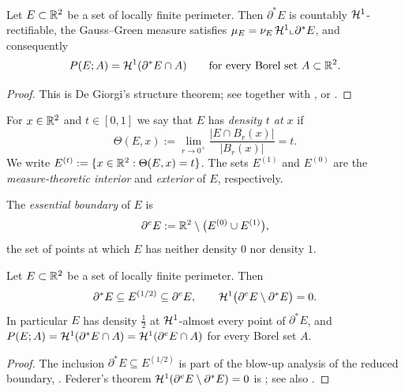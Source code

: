 \begin{theorem}\label{thm:de-giorgi}
Let $E\subset\mathbb{R}^2$ be a set of locally finite perimeter. Then $\partial^*E$ is
countably $\mathcal{H}^1$-rectifiable, the Gauss--Green measure satisfies
$\mu_E=\nu_E\,\mathcal{H}^1\llcorner\partial^*E$, and consequently
\[
  P(E;A)=\mathcal{H}^1(\partial^*E\cap A)\qquad\text{for every Borel set }A\subset\mathbb{R}^2 .
\]
\end{theorem}

\begin{proof}
This is De Giorgi's structure theorem; see
\cite[Theorem~15.9]{Maggi2012} together with
\cite[Corollary~16.1]{Maggi2012}, or
\cite[Section~5.7.3, Theorem~5.15]{EvansGariepy2015}.
\end{proof}

For $x\in\mathbb{R}^2$ and $t\in[0,1]$ we say that $E$ has \emph{density $t$ at $x$} if
\[
  \Theta(E,x):=\lim_{r\to0^+}\frac{|E\cap B_r(x)|}{|B_r(x)|}=t .
\]
We write $E^{(t)}:=\{x\in\mathbb{R}^2:\Theta(E,x)=t\}$. The sets $E^{(1)}$ and
$E^{(0)}$ are the \emph{measure-theoretic interior} and \emph{exterior} of
$E$, respectively.

\begin{definition}\label{def:essential-boundary}
The \emph{essential boundary} of $E$ is
\[
  \partial^e E:=\mathbb{R}^2\setminus\big(E^{(0)}\cup E^{(1)}\big),
\]
the set of points at which $E$ has neither density $0$ nor density $1$.
\end{definition}

\begin{theorem}\label{thm:federer}
Let $E\subset\mathbb{R}^2$ be a set of locally finite perimeter. Then
\[
  \partial^*E\subseteq E^{(1/2)}\subseteq\partial^e E,
  \qquad
  \mathcal{H}^1\big(\partial^e E\setminus\partial^*E\big)=0 .
\]
In particular $E$ has density $\tfrac12$ at $\mathcal{H}^1$-almost every point of
$\partial^*E$, and
$P(E;A)=\mathcal{H}^1(\partial^*E\cap A)=\mathcal{H}^1(\partial^e E\cap A)$ for every Borel
set $A$.
\end{theorem}

\begin{proof}
The inclusion $\partial^*E\subseteq E^{(1/2)}$ is part of the blow-up analysis
of the reduced boundary, \cite[Theorem~15.5]{Maggi2012}. Federer's theorem
$\mathcal{H}^1(\partial^e E\setminus\partial^*E)=0$ is
\cite[Theorem~16.2]{Maggi2012}; see also
\cite[Section~5.8, Theorem~5.16 (Federer's theorem)]{EvansGariepy2015}.
\end{proof}

